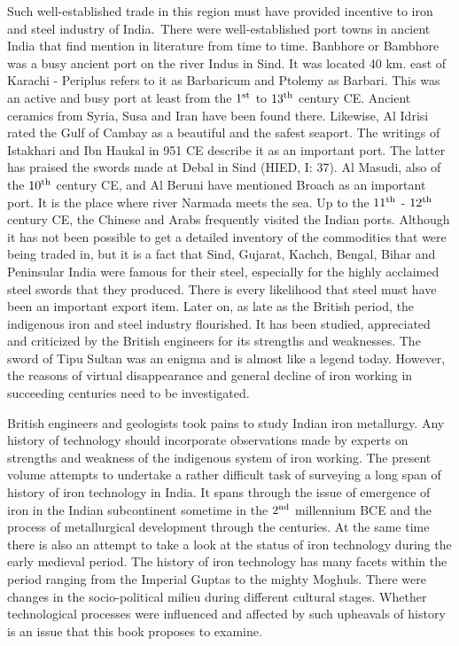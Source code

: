 Such well-established trade in this region must have provided incentive to iron and steel industry of India.~There were well-established port towns in ancient India that find mention in literature from time to time. Banbhore or Bambhore was a busy ancient port on the river Indus in Sind. It was located 40 km. east of Karachi - Periplus refers to it as Barbaricum and Ptolemy as Barbari. This was an active and busy port at least from the $1^{\rm st}$ to $13^{\rm th}$ century CE. Ancient ceramics from Syria, Susa and Iran have been found there. Likewise, Al Idrisi rated the Gulf of Cambay as a beautiful and the safest seaport. The writings of Istakhari and Ibn Haukal in 951 CE describe it as an important port. The latter has praised the swords made at Debal in Sind (HIED, I: 37). Al Masudi, also of the $10^{\rm th}$ century CE, and Al Beruni have mentioned Broach as an important port. It is the place where river Narmada meets the sea. Up to the $11^{\rm th}$ - $12^{\rm th}$ century CE, the Chinese and Arabs frequently visited the Indian ports. Although it has not been possible to get a detailed inventory of the commodities that were being traded in, but it is a fact that Sind, Gujarat, Kachch, Bengal, Bihar and Peninsular India were famous for their steel, especially for the highly acclaimed steel swords that they produced. There is every likelihood that steel must have been an important export item. Later on, as late as the British period, the indigenous iron and steel industry flourished. It has been studied, appreciated and criticized by the British engineers for its strengths and weaknesses. The sword of Tipu Sultan was an enigma and is almost like a legend today. However, the reasons of virtual disappearance and general decline of iron working in succeeding centuries need to be investigated. 

British engineers and geologists took pains to study Indian iron metallurgy. Any history of technology should incorporate observations made by experts on strengths and weakness of the indigenous system of iron working. The present volume attempts to undertake a rather difficult task of surveying a long span of history of iron technology in India. It spans through the issue of emergence of iron in the Indian subcontinent sometime in the $2^{\rm nd}$ millennium BCE and the process of metallurgical development through the centuries. At the same time there is also an attempt to take a look at the status of iron technology during the early medieval period. The history of iron technology has many facets within the period ranging from the Imperial Guptas to the mighty Moghuls. There were changes in the socio-political milieu during different cultural stages. Whether technological processes were influenced and affected by such upheavals of history is an issue that this book proposes to examine. 

